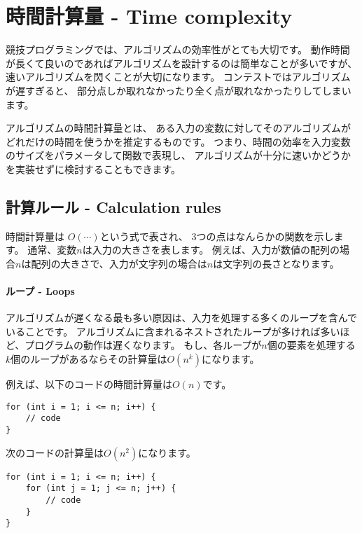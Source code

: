 \chapter{時間計算量 - Time complexity}


競技プログラミングでは、アルゴリズムの効率性がとても大切です。
動作時間が長くて良いのであればアルゴリズムを設計するのは簡単なことが多いですが、
速いアルゴリズムを閃くことが大切になります。
コンテストではアルゴリズムが遅すぎると、
部分点しか取れなかったり全く点が取れなかったりしてしまいます。

アルゴリズムの時間計算量とは、
ある入力の変数に対してそのアルゴリズムがどれだけの時間を使うかを推定するものです。
つまり、時間の効率を入力変数のサイズをパラメータして関数で表現し、
アルゴリズムが十分に速いかどうかを実装せずに検討することもできます。

\section{計算ルール - Calculation rules}

時間計算量は $O(\cdots)$という式で表され、
3つの点はなんらかの関数を示します。
通常、変数$n$は入力の大きさを表します。
例えば、入力が数値の配列の場合$n$は配列の大きさで、入力が文字列の場合は$n$は文字列の長さとなります。

\subsubsection*{ループ - Loops}

アルゴリズムが遅くなる最も多い原因は、入力を処理する多くのループを含んでいることです。
アルゴリズムに含まれるネストされたループが多ければ多いほど、プログラムの動作は遅くなります。
もし、各ループが$n$個の要素を処理する$k$個のループがあるならその計算量は$O(n^k)$になります。

例えば、以下のコードの時間計算量は$O(n)$です。

\begin{lstlisting}
for (int i = 1; i <= n; i++) {
    // code
}
\end{lstlisting}

次のコードの計算量は$O(n^2)$になります。

\begin{lstlisting}
for (int i = 1; i <= n; i++) {
    for (int j = 1; j <= n; j++) {
        // code
    }
}
\end{lstlisting}

